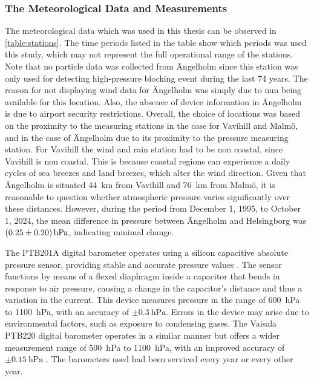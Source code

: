 \subsubsection{The Meteorological Data and Measurements}
The meteorological data which was used in this thesis can be observed in \autoref{table:stations}. The time periods listed in the table show which periods was used this study, which may not represent the full operational range of the stations. Note that no particle data was collected from Ängelholm since this station was only used for detecting high-pressure blocking event during the last 74 years. The reason for not displaying wind data for Ängelholm was simply due to nun being available for this location. Also, the absence of device information in Ängelholm is due to airport security restrictions. Overall, the choice of locations was based on the proximity to the \PM measuring stations in the case for Vavihill and Malmö, and in the case of Ängelholm due to its proximity to the pressure measuring station. For Vavihill the wind and rain station had to be non coastal, since Vavihill is non coastal. This is because coastal regions can experience a daily cycles of sea breezes and land breezes, which alter the wind direction. Given that Ängelholm is situated \SI{44}{\km} from Vavihill and \SI{76}{\km} from Malmö, it is reasonable to question whether atmospheric pressure varies significantly over these distances. However, during the period from December 1, 1995, to October 1, 2024, the mean difference in pressure between Ängelholm and Helsingborg was $\SI{0.25\pm0.20}{\hecto\pascal}$, indicating minimal change. 

The PTB201A digital barometer operates using a silicon capacitive absolute pressure sensor, providing stable and accurate pressure values \cite{vaisalaPTB200DIGITAL1993}. The sensor functions by means of a flexed diaphragm inside a capacitor that bends in response to air pressure, causing a change in the capacitor's distance and thus a variation in the current. This device measures pressure in the range of \SI{600}{\hecto\pascal} to \SI{1100}{\hecto\pascal}, with an accuracy of $\pm\SI{0.3}{\hecto\pascal}$. Errors in the device may arise due to environmental factors, such as exposure to condensing gases. The Vaisala PTB220 digital barometer operates in a similar manner but offers a wider measurement range of \SI{500}{\hecto\pascal} to \SI{1100}{\hecto\pascal}, with an improved accuracy of $\pm\SI{0.15}{\hecto\pascal}$ \cite{vaisalaPTB220SeriesDigital2001}. The barometers used had been serviced every year or every other year.



